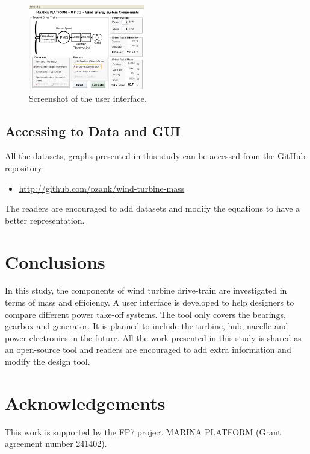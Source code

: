 \documentclass{article}\usepackage{graphicx, color}
\begin{document}
\begin{figure}[t]
  \centering
  \includegraphics[width=0.45\textwidth]{images/marina_gui1}
  \caption{Screenshot of the user interface.} 
  \label{screenshot}
\end{figure}

\subsection{Accessing to Data and GUI}


All the datasets, graphs presented in this study can be accessed from the GitHub repository: 

\begin{itemize}
  \item \url{http://github.com/ozank/wind-turbine-mass}
\end{itemize}

The readers are encouraged to add datasets and modify the equations to have a better representation.

\section{Conclusions}

In this study, the components of wind turbine drive-train are investigated in terms of mass and efficiency. A user interface is developed to help designers to compare different power take-off systems.  The tool only covers the bearings, gearbox and generator. It is planned to include the turbine, hub, nacelle and power electronics in the future. All the work presented in this study is shared as an open-source tool and readers are encouraged to add extra information and modify the design tool.

\section*{Acknowledgements}
This work is supported by the FP7 project MARINA PLATFORM (Grant
agreement number 241402). 



\noindent
\end{document}
